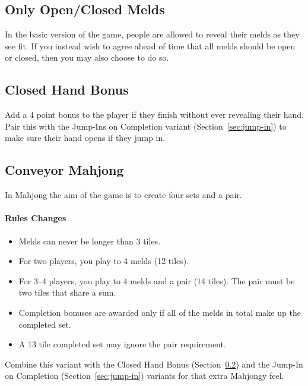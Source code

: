 \subsection{Only Open/Closed Melds}
In the basic version of the game, people are allowed to reveal their melds as they see fit.
If you instead wish to agree ahead of time that all melds should be open or closed, then you may also choose to do so.

\subsection{Closed Hand Bonus}\label{sec:closed-hand}
Add a 4 point bonus to the player if they finish without ever revealing their hand.
Pair this with the Jump-Ins on Completion variant (Section~\ref{sec:jump-in}) to make sure their hand opens if they jump in.

\subsection{Conveyor Mahjong}
In Mahjong the aim of the game is to create four sets and a pair.

\paragraph{Rules Changes}

\begin{itemize}
    \item Melds can never be longer than 3 tiles.
    \item For two players, you play to 4 melds (12 tiles).
    \item For 3--4 players, you play to 4 melds and a pair (14 tiles). The pair must be two tiles that share a sum.
    \item Completion bonuses are awarded only if all of the melds in total make up the completed set. 
    \item A 13 tile completed set may ignore the pair requirement.
\end{itemize}

Combine this variant with the Closed Hand Bonus (Section~\ref{sec:closed-hand}) and the Jump-In on Completion (Section~\ref{sec:jump-in}) variants for that extra Mahjongy feel.